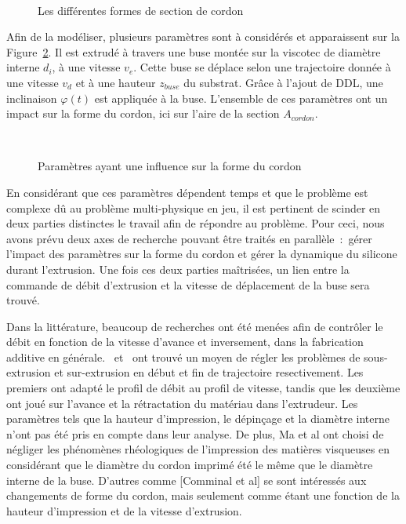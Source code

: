 \documentclass[11pt,a4paper]{article}
\begin{document}
        \begin{figure}[H]
            \centering
            \def\svgwidth{0.75\columnwidth}
            \caption{Les différentes formes de section de cordon}~\label{fig:forme_cordon}
        \end{figure}

        Afin de la modéliser, plusieurs paramètres sont à considérés et apparaissent sur la Figure~\ref{fig:figure_variables}. Il est extrudé à travers une buse montée sur la viscotec de diamètre interne $d_i$, à une vitesse $v_e$. Cette buse se déplace selon une trajectoire donnée à une vitesse $v_d$ et à une hauteur $z_{buse}$ du substrat. Grâce à l'ajout de DDL, une inclinaison $\varphi(t)$ est appliquée à la buse. L'ensemble de ces paramètres ont un impact sur la forme du cordon, ici sur l'aire de la section $A_{cordon}$. 
        
        
        \begin{figure}[H]
            \centering
            \def\svgwidth{0.7\columnwidth}
            \caption{Paramètres ayant une influence sur la forme du cordon}~\label{fig:figure_variables}
        \end{figure}

            
        En considérant que ces paramètres dépendent temps et que le problème est complexe dû au problème multi-physique en jeu, il est pertinent de scinder en deux parties distinctes le travail afin de répondre au problème. Pour ceci, nous avons prévu deux axes de recherche pouvant être traités en parallèle~:~gérer l'impact des paramètres sur la forme du cordon et gérer la dynamique du silicone durant l'extrusion. Une fois ces deux parties maîtrisées, un lien entre la commande de débit d'extrusion et la vitesse de déplacement de la buse sera trouvé. 

        Dans la littérature, beaucoup de recherches ont été menées afin de contrôler le débit en fonction de la vitesse d'avance et inversement, dans la fabrication additive en générale.~\cite{ma2023improving} et~\cite{wu2023modeling} ont trouvé un moyen de régler les problèmes de sous-extrusion et sur-extrusion en début et fin de trajectoire resectivement. Les premiers ont adapté le profil de débit au profil de vitesse, tandis que les deuxième ont joué sur l'avance et la rétractation du matériau dans l'extrudeur. Les paramètres tels que la hauteur d'impression, le dépinçage et la diamètre interne n'ont pas été pris en compte dans leur analyse. De plus, Ma et al ont choisi de négliger les phénomènes rhéologiques de l'impression des matières visqueuses en considérant que le diamètre du cordon imprimé été le même que le diamètre interne de la buse. 
        D'autres comme [Comminal et al] se sont intéressés aux changements de forme du cordon, mais seulement comme étant une fonction de la hauteur d'impression et de la vitesse d'extrusion. 
\end{document}
